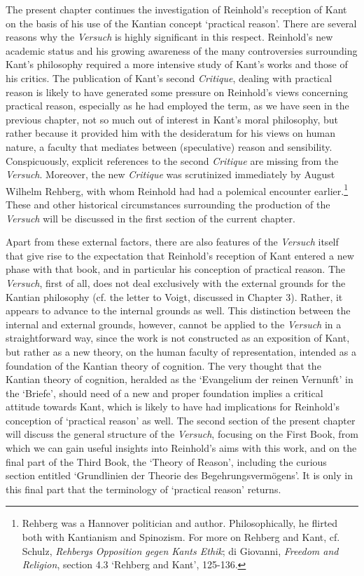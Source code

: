  The present chapter continues the investigation of Reinhold's reception of Kant on the basis of his use of the Kantian concept `practical reason'. There are several reasons why the \textit{Versuch }is highly significant in this respect. Reinhold's new academic status and his growing awareness of the many controversies surrounding Kant's philosophy required a more intensive study of Kant's works and those of his critics. The publication of Kant's second \textit{Critique}, dealing with practical reason is likely to have generated some pressure on Reinhold's views concerning practical reason, especially as he had employed the term, as we have seen in the previous chapter, not so much out of interest in Kant's moral philosophy, but rather because it provided him with the desideratum for his views on human nature, a faculty that mediates between (speculative) reason and sensibility. Conspicuously, explicit references to the second \textit{Critique} are missing from the \textit{Versuch}. Moreover, the new \textit{Critique }was scrutinized immediately by August Wilhelm Rehberg, with whom Reinhold had had a polemical encounter earlier.\footnote{ Rehberg was a Hannover politician and author. Philosophically, he flirted both with Kantianism and Spinozism. For more on Rehberg and Kant, cf. Schulz, \textit{Rehbergs Opposition gegen Kants Ethik}; di Giovanni, \textit{Freedom and Religion}, section 4.3 `Rehberg and Kant', 125{-}136. } These and other historical circumstances surrounding the production of the \textit{Versuch }will be discussed in the first section of the current chapter. 

Apart from these external factors, there are also features of the \textit{Versuch} itself that give rise to the expectation that Reinhold's reception of Kant entered a new phase with that book, and in particular his conception of practical reason. The \textit{Versuch}, first of all, does not deal exclusively with the external grounds for the Kantian philosophy (cf. the letter to Voigt, discussed in Chapter 3). Rather, it appears to advance to the internal grounds as well. This distinction between the internal and external grounds, however, cannot be applied to the \textit{Versuch }in a straightforward way, since the work is not constructed as an exposition of Kant, but rather as a new theory, on the human faculty of representation, intended as a foundation of the Kantian theory of cognition. The very thought that the Kantian theory of cognition, heralded as the `Evangelium der reinen Vernunft' in the `Briefe', should need of a new and proper foundation implies a critical attitude towards Kant, which is likely to have had implications for Reinhold's conception of `practical reason' as well. The second section of the present chapter will discuss the general structure of the \textit{Versuch}, focusing on the First Book, from which we can gain useful insights into Reinhold's aims with this work, and on the final part of the Third Book, the `Theory of Reason', including the curious section entitled `Grundlinien der Theorie des Begehrungsverm\"{o}gens'. It is only in this final part that the terminology of `practical reason' returns. 

